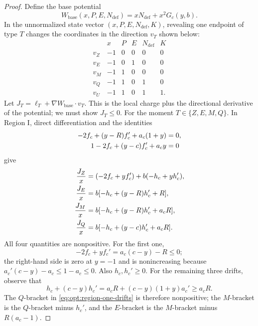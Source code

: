 \begin{proof}
Define the base potential
\begin{equation}
 W_{\mathrm{base}}(x,P,E,N_{\mathrm{def}})=xN_{\mathrm{def}}+x^2G_c(y,b).
 \label{eq:opt:base-potential}
\end{equation}
In the unnormalized state vector $(x,P,E,N_{\mathrm{def}},K)$, revealing one
endpoint of type $T$ changes the coordinates in the direction $v_T$ shown
below:
\begin{equation}
\begin{array}{c|ccccc}
 &x&P&E&N_{\mathrm{def}}&K\\ \hline
 v_Z&-1&0&0&0&0\\
 v_E&-1&0&1&0&0\\
 v_M&-1&1&0&0&0\\
 v_Q&-1&1&0&1&0\\
 v_U&-1&1&0&1&1.
\end{array}
 \label{eq:opt:state-directions}
\end{equation}
Let
$J_T=\ell_T+\nabla W_{\mathrm{base}}\mathbin{\cdot}v_T$.  This is the
local charge plus the directional derivative of the potential; we must show
$J_T\le0$.  For the moment $T\in\{Z,E,M,Q\}$.  In Region I, direct
differentiation and
the identities
\begin{align}
 -2f_c+(y-R)f_c'+a_c(1+y)&=0,
 \notag\\
 1-2f_c+(y-c)f_c'+a_cy&=0
 \label{eq:opt:f-hjb-identities}
\end{align}
give
\begin{align}
 \frac{J_Z}{x}
 &=(-2f_c+yf_c')+b(-h_c+yh_c'),
 \notag\\
 \frac{J_E}{x}
 &=b[-h_c+(y-R)h_c'+R],
 \notag\\
 \frac{J_M}{x}
 &=b[-h_c+(y-R)h_c'+a_cR],
 \notag\\
 \frac{J_Q}{x}
 &=b[-h_c+(y-c)h_c'+a_cR].
 \label{eq:opt:region-one-drifts}
\end{align}
All four quantities are nonpositive.  For the first one,
\begin{equation}
 -2f_c+yf_c'=a_c(c-y)-R\le0;
 \label{eq:opt:zero-drift-sign}
\end{equation}
the right-hand side is zero at $y=-1$ and is nonincreasing because
$a_c'(c-y)-a_c\le1-a_c\le0$.  Also $h_c,h_c'\ge0$.  For the remaining
three drifts, observe that
\begin{equation}
 h_c+(c-y)h_c'
 =a_cR+(c-y)(1+y)a_c'\ge a_cR.
 \label{eq:opt:h-sign-identity}
\end{equation}
The $Q$-bracket in \eqref{eq:opt:region-one-drifts} is therefore
nonpositive; the $M$-bracket is the $Q$-bracket minus $h_c'$, and the
$E$-bracket is the $M$-bracket minus $R(a_c-1)$.


\end{proof}
